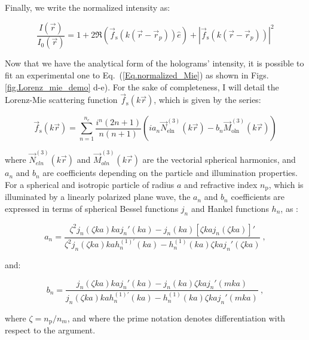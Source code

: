 Finally, we write the normalized intensity as:

\begin{equation}
	\frac{I(\vec{r})}{I_0(\vec{r})} = 1 + 2 \Re 
	\left(  
	\vec{f}_\mathrm{s}(k(\vec{r}- \vec{r}_p)) \hat{e}
	\right)
	+
	|
	\vec{f}_\mathrm{s}(k(\vec{r}- \vec{r}_p))
	|^2
	\label{Eq.normalized_Mie} 
\end{equation}


Now that we have the analytical form of the holograms' intensity, it is possible to fit an experimental one to Eq.~(\ref{Eq.normalized_Mie}) as shown in Figs.\ref{fig.Lorenz_mie_demo} d-e). For the sake of completeness, I will detail the Lorenz-Mie scattering function $\vec{f}_\mathrm{s}(k\vec{r})$, which is given by the series:

\begin{equation}
	\vec{f}_\mathrm{s}(k \vec{r}) = \sum _{n=1} ^{n_c} 
	\frac
	{
		i^n (2n +1)
	}
	{
		n(n+1)
	}
	\left(
	i a_n \vec{N}^{(3)}_\mathrm{eln}(k\vec{r})
	-
	b_n \vec{M}^{(3)}_\mathrm{oln}(k\vec{r})
	\right)
	\label{Eq.Lorenz-Mie-function}
\end{equation} 


where $\vec{N}^{(3)}_{eln}(k\vec{r})$ and $\vec{M}^{(3)}_{oln}(k\vec{r})$ are the vectorial spherical harmonics, and $a_n$ and $b_n$ are coefficients depending on the particle and illumination properties. For a spherical and isotropic particle of radius $a$ and refractive index $n_\mathrm{p}$, which is illuminated by a linearly polarized plane wave, the $a_n$ and $b_n$ coefficients are expressed in terms of spherical Bessel functions $j_n$ and Hankel functions $h_n$, as \cite{f_bohren_absorption_1998}:

\begin{equation}
	a_n = 
	\frac
	{
		\zeta^2 j_n (\zeta k a)k a j_n' (k a) - j_n(ka)[\zeta kaj_n(\zeta ka)]'
	}
	{
		\zeta^2 j_n (\zeta k a)k a h_n^{(1)'} (k a) - h_n^{(1)}(ka)\zeta kaj_n'(\zeta ka)
	} ~,
	\label{Eq:an}
\end{equation}

and:

\begin{equation}
	b_n =
	\frac
	{
		j_n(\zeta k a) kaj_n'(ka) - j_n (ka) \zeta kaj_n'(mka)
	}
	{
		j_n(\zeta k a) kah_n^{(1)'}(ka) - h_n^{(1)} (ka) \zeta kaj_n '(mka)
	} ~,
	\label{Eq:bn}
\end{equation}


where $\zeta = n_\mathrm{p} / n_m $, and where the prime notation denotes differentiation with respect to the argument. 

